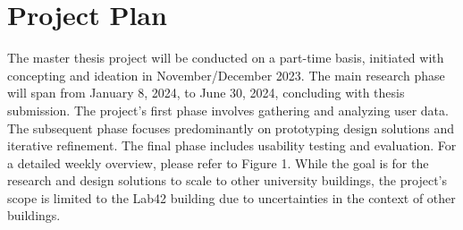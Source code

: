 \section{Project Plan}

The master thesis project will be conducted on a part-time basis, initiated with concepting and ideation in November/December 2023. The main research phase will span from January 8, 2024, to June 30, 2024, concluding with thesis submission. The project's first phase involves gathering and analyzing user data. The subsequent phase focuses predominantly on prototyping design solutions and iterative refinement. The final phase includes usability testing and evaluation. For a detailed weekly overview, please refer to Figure 1. While the goal is for the research and design solutions to scale to other university buildings, the project's scope is limited to the Lab42 building due to uncertainties in the context of other buildings.
